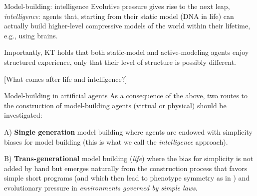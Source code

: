 \begin{frame}[label=ladila]{Model-building: intelligence}
 Evolutive pressure gives rise to the next leap, {\em intelligence}: agents that, starting from their static model (DNA in life) can actually build higher-level compressive models of the world within their lifetime, e.g., using brains.\vfill
 
 Importantly, KT holds that both static-model and active-modeling agents enjoy structured experience, only that their level of structure is possibly different.  \vfill
 
 
 [What comes after life and intelligence?]
 
\end{frame}


\begin{frame}[label=ladila]{Model-building in artificial agents}
As a consequence of the above, two routes to the construction of model-building agents   (virtual or physical)  should be investigated: \vfill

A) {\bf Single generation} model building where agents are endowed with simplicity biases for model building (this is what we call the  {\em intelligence} approach). \vfill


B) {\bf Trans-generational} model building ({\em life}) where the bias for simplicity is not added by hand but emerges naturally from the construction process that favors simple short programs (and which then lead to phenotype symmetry as in \citep{Johnston2022})  and evolutionary pressure in {\em  environments governed by simple laws}.  
\end{frame}
